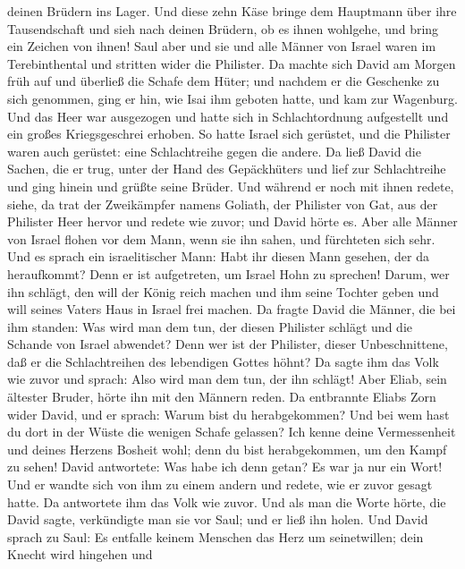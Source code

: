 deinen Brüdern ins Lager.  Und diese zehn Käse bringe dem
Hauptmann über ihre Tausendschaft und sieh nach deinen Brüdern, ob es
ihnen wohlgehe, und bring ein Zeichen von ihnen!  Saul
aber und sie und alle Männer von Israel waren im Terebinthental und
stritten wider die Philister.  Da machte sich David am
Morgen früh auf und überließ die Schafe dem Hüter; und nachdem er die
Geschenke zu sich genommen, ging er hin, wie Isai ihm geboten hatte, und
kam zur Wagenburg. Und das Heer war ausgezogen und hatte sich in
Schlachtordnung aufgestellt und ein großes Kriegsgeschrei erhoben.
 So hatte Israel sich gerüstet, und die Philister waren
auch gerüstet: eine Schlachtreihe gegen die andere.  Da
ließ David die Sachen, die er trug, unter der Hand des Gepäckhüters und
lief zur Schlachtreihe und ging hinein und grüßte seine Brüder.
 Und während er noch mit ihnen redete, siehe, da trat der
Zweikämpfer namens Goliath, der Philister von Gat, aus der Philister
Heer hervor und redete wie zuvor; und David hörte es. 
Aber alle Männer von Israel flohen vor dem Mann, wenn sie ihn sahen, und
fürchteten sich sehr.  Und es sprach ein israelitischer
Mann: Habt ihr diesen Mann gesehen, der da heraufkommt? Denn er ist
aufgetreten, um Israel Hohn zu sprechen! Darum, wer ihn schlägt, den
will der König reich machen und ihm seine Tochter geben und will seines
Vaters Haus in Israel frei machen.  Da fragte David die
Männer, die bei ihm standen: Was wird man dem tun, der diesen Philister
schlägt und die Schande von Israel abwendet? Denn wer ist der Philister,
dieser Unbeschnittene, daß er die Schlachtreihen des lebendigen Gottes
höhnt?  Da sagte ihm das Volk wie zuvor und sprach: Also
wird man dem tun, der ihn schlägt!  Aber Eliab, sein
ältester Bruder, hörte ihn mit den Männern reden. Da entbrannte Eliabs
Zorn wider David, und er sprach: Warum bist du herabgekommen? Und bei
wem hast du dort in der Wüste die wenigen Schafe gelassen? Ich kenne
deine Vermessenheit und deines Herzens Bosheit wohl; denn du bist
herabgekommen, um den Kampf zu sehen!  David antwortete:
Was habe ich denn getan? Es war ja nur ein Wort!  Und er
wandte sich von ihm zu einem andern und redete, wie er zuvor gesagt
hatte. Da antwortete ihm das Volk wie zuvor.  Und als man
die Worte hörte, die David sagte, verkündigte man sie vor Saul; und er
ließ ihn holen.  Und David sprach zu Saul: Es entfalle
keinem Menschen das Herz um seinetwillen; dein Knecht wird hingehen und
